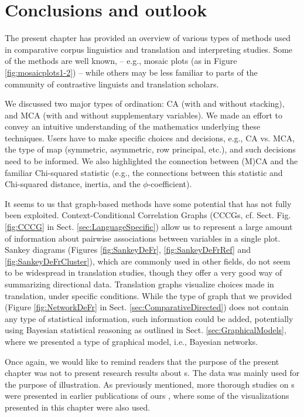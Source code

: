 

\section{Conclusions and outlook}\label{sec:Conclusions}

The present chapter has provided an overview of various types of
methods used in comparative corpus linguistics and translation and
interpreting studies. Some of the methods are well known, -- e.g.,
mosaic plots (as in Figure \ref{fig:mosaicplots1-2}) -- while others
may be less familiar to parts of the community of contrastive
linguists and translation
scholars.

We discussed two major types of ordination: CA (with and without
stacking), and MCA (with and without supplementary variables). We made
an effort to convey an intuitive understanding of the mathematics
underlying these techniques. Users have to make specific choices and
decisions, e.g., CA vs. MCA, the type of map (symmetric, asymmetric,
row principal, etc.), and such decisions need to be
informed.
%
We also highlighted the connection between (M)CA and the familiar
Chi-squared statistic (e.g., the connections between this statistic
and Chi-squared distance, inertia, and the $\phi$-coefficient).

It seems to us that graph-based methods have some potential that has
not fully been exploited. Context-Conditional Correlation Graphs
(CCCGs, cf. Sect. Fig. \ref{fig:CCCG} in
Sect. \ref{sec:LanguageSpecific}) allow us to represent a large amount
of information about pairwise associations between variables in a
single plot. Sankey diagrams (Figures \ref{fig:SankeyDeFr},
\ref{fig:SankeyDeFrRef} and \ref{fig:SankeyDeFrCluster}), which are
commonly used in other fields, do not seem to be widespread in
translation studies, though they offer a very good way of summarizing
directional data. Translation graphs visualize choices made in
translation, under specific conditions. While the type of graph that
we provided (Figure \ref{fig:NetworkDeFr} in
Sect. \ref{sec:ComparativeDirected}) does not contain any type of
statistical information, such information could be added, potentially
using Bayesian statistical reasoning as outlined in
Sect. \ref{sec:GraphicalModels}, where we presented a type of
graphical model, i.e., Bayesian networks.

Once again, we would like to remind readers that the purpose of
the present chapter was not to present research results about \pradv
s. The data was mainly used for the purpose of illustration.  As
previously mentioned, more thorough studies on \pradv s were presented
in earlier publications of ours
\citep{Atayanetal2019,GastAtayan2019,Gastetal2019,Atayan2021b,Atayan2021a},
where some of the visualizations presented in this chapter were also
used.


